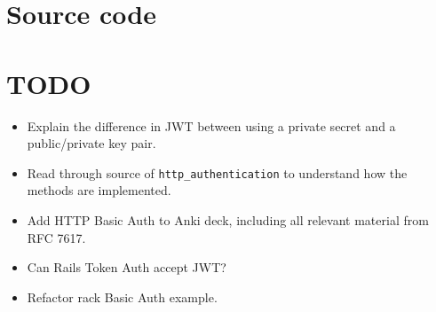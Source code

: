 \documentclass{article}
\begin{document}
\section{Source code}

\section{TODO}

\begin{itemize}
  \item Explain the difference in JWT between using a private secret and a
    public/private key pair.
  \item Read through source of \texttt{http\_authentication} to understand how
    the methods are implemented.
  \item Add HTTP Basic Auth to Anki deck, including all relevant material from
    RFC 7617.
  \item Can Rails Token Auth accept JWT?
  \item Refactor rack Basic Auth example.
\end{itemize}
\end{document}
